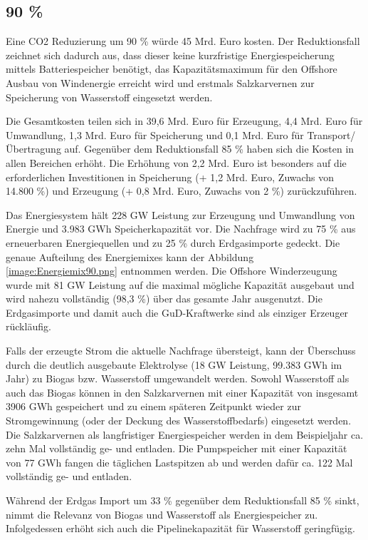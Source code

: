 \subsection{90 \%}
Eine CO2 Reduzierung um 90 \% würde 45 Mrd. Euro kosten. Der Reduktionsfall zeichnet sich dadurch aus, dass dieser keine kurzfristige Energiespeicherung mittels Batteriespeicher benötigt, das Kapazitätsmaximum für den Offshore Ausbau von Windenergie erreicht wird und erstmals Salzkarvernen zur Speicherung von Wasserstoff eingesetzt werden.

Die Gesamtkosten teilen sich in 39,6 Mrd. Euro für Erzeugung, 4,4 Mrd. Euro für Umwandlung, 1,3 Mrd. Euro für Speicherung und 0,1 Mrd. Euro für Transport/Übertragung auf. Gegenüber dem Reduktionsfall 85 \% haben sich die Kosten in allen Bereichen erhöht. Die Erhöhung von 2,2 Mrd. Euro ist besonders auf die erforderlichen Investitionen in Speicherung (+ 1,2 Mrd. Euro, Zuwachs von 14.800 \%) und Erzeugung (+ 0,8 Mrd. Euro, Zuwachs von 2 \%) zurückzuführen.

Das Energiesystem hält 228 GW Leistung zur Erzeugung und Umwandlung von Energie und 3.983 GWh Speicherkapazität vor. Die Nachfrage wird zu 75 \% aus erneuerbaren Energiequellen und zu 25 \% durch Erdgasimporte gedeckt. Die genaue Aufteilung des Energiemixes kann der Abbildung \ref{image:Energiemix90.png} entnommen werden. Die Offshore Winderzeugung wurde mit 81 GW Leistung auf die maximal mögliche Kapazität ausgebaut und wird nahezu vollständig (98,3 \%) über das gesamte Jahr ausgenutzt. 
Die Erdgasimporte und damit auch die GuD-Kraftwerke sind als einziger Erzeuger rückläufig.  


Falls der erzeugte Strom die aktuelle Nachfrage übersteigt, kann der Überschuss durch die deutlich ausgebaute Elektrolyse (18 GW Leistung, 99.383 GWh im Jahr) zu Biogas bzw. Wasserstoff umgewandelt werden. Sowohl Wasserstoff als auch das Biogas können in den Salzkarvernen mit einer Kapazität von insgesamt 3906 GWh gespeichert und zu einem späteren Zeitpunkt wieder zur Stromgewinnung (oder der Deckung des Wasserstoffbedarfs) eingesetzt werden. Die Salzkarvernen als langfristiger Energiespeicher werden in dem Beispieljahr ca. zehn Mal vollständig ge- und entladen. Die Pumpspeicher mit einer Kapazität von 77 GWh fangen die täglichen Lastspitzen ab und werden dafür ca. 122 Mal vollständig ge- und entladen.

Während der Erdgas Import um 33 \% gegenüber dem Reduktionsfall 85 \% sinkt, nimmt die Relevanz von Biogas und Wasserstoff als Energiespeicher zu. Infolgedessen erhöht sich auch die Pipelinekapazität für Wasserstoff geringfügig. 

